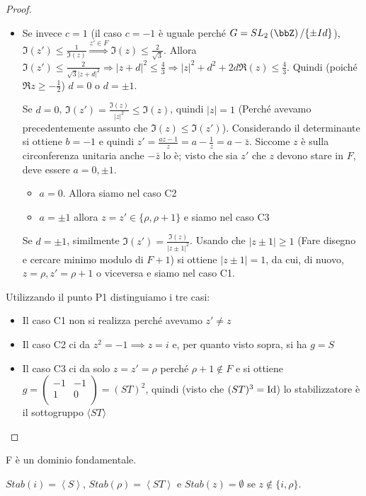 \begin{proof}
\begin{itemize}
\item Se invece $c=1$ (il caso $c=-1$ è uguale perché
  $G=SL_2 \left( \bbZ \right)/\{\pm Id\}$),
  $\Im(z') \leq \frac{1}{\Im(z)} \stackrel{z' \in F}{\Rightarrow} \Im(z) \leq \frac{2}{\sqrt{3}}$.
  Allora $\Im(z') \leq \frac{2}{\sqrt{3}|z+d|^2} \Rightarrow
  |z+d|^2 \leq \frac{4}{3} \Rightarrow |z|^2+d^2+2d \Re(z) \leq \frac{4}{3}$. 
  Quindi (poiché $\Re z \ge -\frac{1}{2}$) $d=0$ o $d=\pm 1$.

  Se $d=0$, $\Im(z') = \frac{\Im(z)}{|z|^2} \leq \Im(z)$, quindi $|z|=1$ (Perché avevamo precedentemente assunto che $\Im(z) \le \Im(z')$).
  Considerando il determinante si ottiene $b = -1$ e quindi $z' = \frac{az - 1}{z} = a - \frac{1}{z} = a - \bar{z}$. Siccome $z$ è sulla circonferenza unitaria anche $- \bar{z}$ lo è; visto che sia $z'$ che $z$ devono stare in $F$, deve essere $a = 0, \pm 1$.
  \begin{itemize}
  \item $a = 0$. Allora siamo nel caso C2
  \item $a = \pm 1$ allora $z = z' \in \{\rho, \rho + 1\}$ e siamo nel caso C3
  \end{itemize}

  Se $d=\pm 1$, similmente $\Im(z') = \frac{\Im(z)}{|z \pm 1|^2}$. Usando che $|z \pm 1| \ge 1$ (Fare disegno e cercare minimo modulo di $F + 1$)
  si ottiene $|z \pm 1|=1$, da cui, di nuovo, $z=\rho, z'=\rho + 1$ o viceversa e siamo nel caso C1.
\end{itemize}

\bigskip
{} Utilizzando il punto P1 distinguiamo i tre casi:
\begin{itemize}
\item Il caso C1 non si realizza perché avevamo $z' \neq z$
\item Il caso C2 ci da $z^2 = -1 \implies z = i$ e, per quanto visto sopra, si ha $g = S$
\item Il caso C3 ci da solo $z = z' = \rho$ perché $\rho + 1 \notin F$ e si ottiene $g = \left(\begin{array}{cc} -1 & -1 \\ 1 & 0 \\ \end{array} \right) = (ST)^2$, quindi (visto che $(ST)^3 = \text{Id}$) lo stabilizzatore è il sottogruppo $\langle ST \rangle$
\end{itemize}
\end{proof}

\begin{corollario}
F è un dominio fondamentale.

$Stab(i)=\left\langle S \right\rangle$, 
$Stab(\rho)=\left\langle ST \right\rangle$ e $Stab(z)=\emptyset$ se 
$z \notin \{i, \rho \}$.
\end{corollario}

